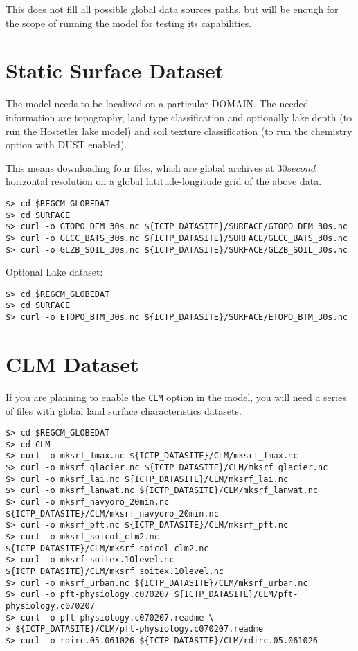This does not fill all possible global data sources paths, but will be enough
for the scope of running the model for testing its capabilities.

\section{Static Surface Dataset}

The model needs to be localized on a particular DOMAIN. The needed information
are topography, land type classification and optionally lake depth (to run the
Hostetler lake model) and soil texture classification (to run the chemistry option
with DUST enabled).

This means downloading four files, which are global archives at $30 second$
horizontal resolution on a global latitude-longitude grid of the above data.

\begin{Verbatim}
$> cd $REGCM_GLOBEDAT
$> cd SURFACE
$> curl -o GTOPO_DEM_30s.nc ${ICTP_DATASITE}/SURFACE/GTOPO_DEM_30s.nc
$> curl -o GLCC_BATS_30s.nc ${ICTP_DATASITE}/SURFACE/GLCC_BATS_30s.nc
$> curl -o GLZB_SOIL_30s.nc ${ICTP_DATASITE}/SURFACE/GLZB_SOIL_30s.nc
\end{Verbatim}

Optional Lake dataset:

\begin{Verbatim}
$> cd $REGCM_GLOBEDAT
$> cd SURFACE
$> curl -o ETOPO_BTM_30s.nc ${ICTP_DATASITE}/SURFACE/ETOPO_BTM_30s.nc
\end{Verbatim}

\section{CLM Dataset}
\label{clmdata}

If you are planning to enable the \verb=CLM= option in the model, you will need
a series of files with global land surface characteristics datasets.

\begin{Verbatim}
$> cd $REGCM_GLOBEDAT
$> cd CLM
$> curl -o mksrf_fmax.nc ${ICTP_DATASITE}/CLM/mksrf_fmax.nc
$> curl -o mksrf_glacier.nc ${ICTP_DATASITE}/CLM/mksrf_glacier.nc
$> curl -o mksrf_lai.nc ${ICTP_DATASITE}/CLM/mksrf_lai.nc
$> curl -o mksrf_lanwat.nc ${ICTP_DATASITE}/CLM/mksrf_lanwat.nc
$> curl -o mksrf_navyoro_20min.nc ${ICTP_DATASITE}/CLM/mksrf_navyoro_20min.nc
$> curl -o mksrf_pft.nc ${ICTP_DATASITE}/CLM/mksrf_pft.nc
$> curl -o mksrf_soicol_clm2.nc ${ICTP_DATASITE}/CLM/mksrf_soicol_clm2.nc
$> curl -o mksrf_soitex.10level.nc ${ICTP_DATASITE}/CLM/mksrf_soitex.10level.nc
$> curl -o mksrf_urban.nc ${ICTP_DATASITE}/CLM/mksrf_urban.nc
$> curl -o pft-physiology.c070207 ${ICTP_DATASITE}/CLM/pft-physiology.c070207
$> curl -o pft-physiology.c070207.readme \
> ${ICTP_DATASITE}/CLM/pft-physiology.c070207.readme
$> curl -o rdirc.05.061026 ${ICTP_DATASITE}/CLM/rdirc.05.061026
\end{Verbatim}


